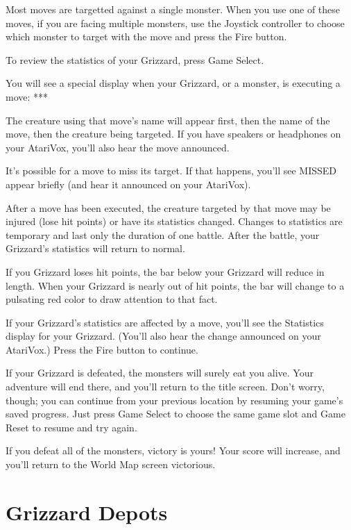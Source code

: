 \documentclass[12pt,twoside,openright,book]{memoir}
\begin{document}
Most moves are  targetted against a single monster. When  you use one of
these  moves, if  you are  facing  multiple monsters,  use the  Joystick
controller to choose which monster to target with the move and press the
Fire button.

To review the statistics of your Grizzard, press Game Select.

You will  see a  special display  when your Grizzard,  or a  monster, is
executing a move: ***

The creature using that move's name  will appear first, then the name of
the move,  then the  creature being  targeted. If  you have  speakers or
headphones on your AtariVox, you'll also hear the move announced.

It's possible for a move to miss its target. If that happens, you'll see
MISSED appear briefly (and hear it announced on your AtariVox).

After a move  has been executed, the creature targeted  by that move may
be injured (lose hit points) or  have its statistics changed. Changes to
statistics  are temporary  and last  only  the duration  of one  battle.
After the battle, your Grizzard's statistics will return to normal.

If  you Grizzard  loses hit  points, the  bar below  your Grizzard  will
reduce in  length. When your Grizzard  is nearly out of  hit points, the
bar will change to a pulsating red color to draw attention to that fact.

If your  Grizzard's statistics are  affected by  a move, you'll  see the
Statistics  display for  your  Grizzard. (You'll  also  hear the  change
announced on your AtariVox.) Press the Fire button to continue.

If your  Grizzard is defeated, the  monsters will surely eat  you alive.
Your adventure  will end there, and  you'll return to the  title screen.
Don't worry,  though; you  can continue from  your previous  location by
resuming your  game's saved progress.  Just press Game Select  to choose
the same game slot and Game Reset to resume and try again.

If you defeat all of the monsters, victory is yours! Your score will
increase, and you'll return to the World Map screen victorious.



\section{Grizzard Depots}\label{Grizzard Depots}
\end{document}
